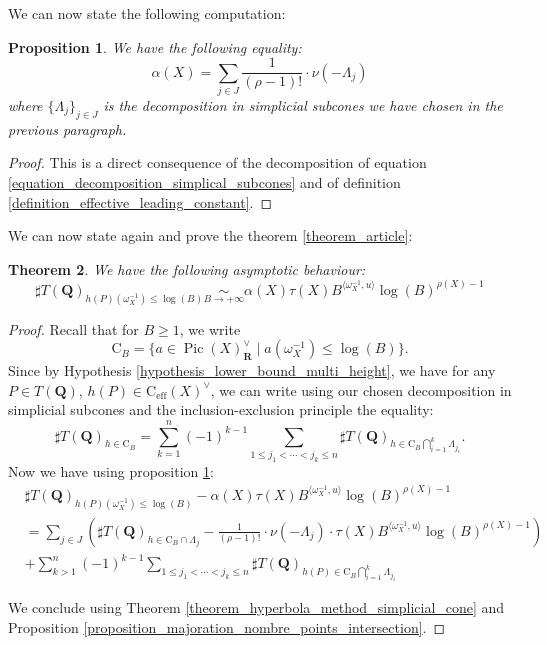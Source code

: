 \documentclass{proc-l}
\newcommand{\R}{\mathbf{R}}
\newcommand{\Q}{\mathbf{Q}}
\newcommand{\cone}{\text{C}_{\text{eff}}(X)}
\DeclareMathOperator{\Pic}{Pic}
\newcommand{\w}{\omega}
\newtheorem{theorem}{Theorem}[section]
\newtheorem{prop}[theorem]{Proposition}
\theoremstyle{definition}
\theoremstyle{remark}
\numberwithin{equation}{section}
\begin{document}
We can now state the following computation:


\begin{prop}\label{proposition_computation_effective_constant}
    We have the following equality:
    $$\alpha(X) = \sum\limits_{j \in J} \frac{1}{(\rho -1)!} \cdot \nu(-\Lambda_j)   $$where $\{ \Lambda_j \}_{j \in J}$ is the decomposition in simplicial subcones we have chosen in the previous paragraph.
\end{prop}

\begin{proof}
    This is a direct consequence of the decomposition of equation \ref{equation_decomposition_simplical_subcones} and of definition \ref{definition_effective_leading_constant}.
\end{proof}

We can now state again and prove the theorem \ref{theorem_article}:

\begin{theorem}
    We have the following asymptotic behaviour: $$\sharp T(\Q)_{h(P)(\w_X^{-1}) \leqslant \log(B)}   \underset{B \rightarrow +\infty}{\sim} \alpha(X) \tau(X) B^{\langle \w_{X}^{-1},u \rangle} \log(B)^{\rho(X) - 1} $$
\end{theorem}

\begin{proof}
    Recall that for $B \geqslant 1$, we write $$\mathrm{C}_B = \{ a \in \Pic(X)_{\R}^{\vee} \mid a(\w_{X}^{-1}) \leqslant \log(B) \} .$$
    Since by Hypothesis \ref{hypothesis_lower_bound_multi_height}, we have for any $P \in T(\Q)$, $h(P) \in \cone^{\vee}$, we can write using our chosen decomposition in simplicial subcones and the inclusion-exclusion principle the equality: $$\sharp T(\Q)_{h \in \mathrm{C}_B} 
= \sum_{k = 1}^n (-1)^{k-1} 
\sum_{1 \leqslant j_1 < \cdots < j_k \leqslant n}
\sharp T(\Q)_{h \in \mathrm{C}_B \bigcap_{i = 1}^k \Lambda_{j_i}}.$$Now we have using proposition \ref{proposition_computation_effective_constant}:
\begin{align*}
    & \sharp T(\Q)_{h(P)(\w_X^{-1}) \leqslant \log(B)}   - \alpha(X) \tau(X) B^{\langle \w_{X}^{-1},u \rangle} \log(B)^{\rho(X) - 1} \\
    &= \sum\limits_{j \in J} \left( \sharp T(\Q)_{h \in \mathrm{C}_B \cap \Lambda_j} - \frac{1}{(\rho-1)!} \cdot \nu(-\Lambda_j) \cdot \tau(X) B^{\langle \w_{X}^{-1},u \rangle} \log(B)^{\rho(X) - 1} \right) \\
    &+ \sum_{k > 1}^n (-1)^{k-1} 
\sum_{1 \leqslant j_1 < \cdots < j_k \leqslant n}
\sharp T(\Q)_{h(P) \in \mathrm{C}_B \bigcap_{i = 1}^k \Lambda_{j_i}}
\end{align*}

We conclude using Theorem \ref{theorem_hyperbola_method_simplicial_cone} and Proposition \ref{proposition_majoration_nombre_points_intersection}.
\end{proof}








\end{document}
